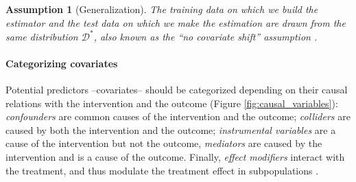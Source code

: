 \documentclass[french,12pt,twoside,a4paper]{book}
\newtheorem{assumption}{Assumption}
\begin{document}
\begin{background_box_left}
  \begin{assumption}[Generalization]\label{assumption:generalization} The training
    data on which we build the estimator and the test data on which we make the
    estimation are drawn from the same distribution $\mathcal D^*$, also known as
    the ``no covariate shift'' assumption \citep{jesson_identifying_2020}.
  \end{assumption}


  \paragraph{Categorizing covariates}
  Potential predictors --covariates-- should be categorized depending on their
  causal relations with the intervention and the outcome (Figure
  \ref{fig:causal_variables}): \emph{confounders} are common causes of the
  intervention and the outcome; \emph{colliders} are caused by both the
  intervention and the outcome; \emph{instrumental variables} are a cause of the
  intervention but not the outcome, \emph{mediators} are caused by the
  intervention and is a cause of the outcome. Finally, \emph{effect modifiers}
  interact with the treatment, and thus
  modulate the treatment effect in subpopulations \citep{attia2022proposal}.

\end{background_box_left}
\end{document}
